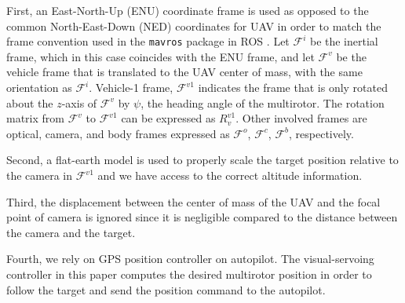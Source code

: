 \documentclass[letterpaper, 10 pt, conference]{ieeeconf}  %
\begin{document}
First, an East-North-Up (ENU) coordinate frame is used as opposed to the common North-East-Down (NED) coordinates for UAV \cite{UAVbook} in order to match the frame convention used in the \texttt{mavros} package in ROS \cite{mavros}. Let $\mathcal{F}^i$ be the inertial frame, which in this case coincides with the ENU frame, and let $\mathcal{F}^v$ be the vehicle frame that is translated to the UAV center of mass, with the same orientation as $\mathcal{F}^i$. Vehicle-1 frame, $\mathcal{F}^{v1}$ indicates the frame that is only rotated about the $z$-axis of $\mathcal{F}^{v}$ by $\psi$, the heading angle of the multirotor. The rotation matrix from $\mathcal{F}^v$ to $\mathcal{F}^{v1}$ can be expressed as $R^{v1}_v$. Other involved frames are optical, camera, and body frames expressed as $\mathcal{F}^o$, $\mathcal{F}^c$, $\mathcal{F}^b$, respectively. 

Second, a flat-earth model is used to properly scale the target position relative to the camera in $\mathcal{F}^{v1}$ and we have access to the correct altitude information. 

Third, the displacement between the center of mass of the UAV and the focal point of camera is ignored since it is negligible compared to the distance between the camera and the target. 

Fourth, we rely on GPS position controller on autopilot. The visual-servoing controller in this paper computes the desired multirotor position in order to follow the target and send the position command to the autopilot.
\end{document}
